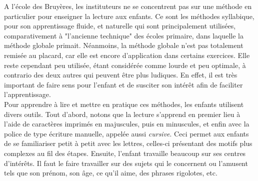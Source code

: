 A l'école des Bruyères, les instituteurs ne se concentrent pas sur une méthode en particulier pour enseigner la lecture aux enfants. Ce sont les méthodes syllabique, pour son apprentissage fluide, et naturelle qui sont principalement utilisées, comparativement à "l'ancienne technique" des écoles primaire, dans laquelle la méthode globale primait. Néanmoins, la méthode globale n'est pas totalement remisée au placard, car elle est encore d'application dans certains exercices. Elle reste cependant peu utilisée, étant considérée comme lourde et peu optimale, à contrario des deux autres qui peuvent être plus ludiques. En effet, il est très important de faire sens pour l'enfant et de susciter son intérêt afin de faciliter l'apprentissage.\\

Pour apprendre à lire et mettre en pratique ces méthodes, les enfants utilisent divers outils. Tout d'abord, notons que la lecture s'apprend en premier lieu à l'aide de caractères imprimés en majuscules, puis en minuscules, et enfin avec la police de type écriture manuelle, appelée aussi \textit{cursive}. Ceci permet aux enfants de se familiariser petit à petit avec les lettres, celles-ci présentant des motifs plus complexes au fil des étapes. Ensuite, l'enfant travaille beaucoup sur ses centres d'intérêts. Il faut le faire travailler sur des sujets qui le concernent ou l'amusent tels que son prénom, son âge, ce qu'il aime, des phrases rigolotes, etc.\\

